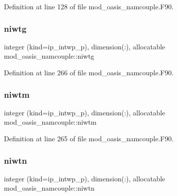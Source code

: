 Definition at line 128 of file mod\+\_\+oasis\+\_\+namcouple.\+F90.

\mbox{\label{namespacemod__oasis__namcouple_a28e887d61cc4b10c00c33a7d0f51a275}} 
\subsubsection{\texorpdfstring{niwtg}{niwtg}}
{\footnotesize\ttfamily integer (kind=ip\+\_\+intwp\+\_\+p), dimension(\+:), allocatable mod\+\_\+oasis\+\_\+namcouple\+::niwtg\hspace{0.3cm}{\ttfamily [private]}}



Definition at line 266 of file mod\+\_\+oasis\+\_\+namcouple.\+F90.

\mbox{\label{namespacemod__oasis__namcouple_a90e4ce86f77bf89c71a9277ff9b5dcbb}} 
\subsubsection{\texorpdfstring{niwtm}{niwtm}}
{\footnotesize\ttfamily integer (kind=ip\+\_\+intwp\+\_\+p), dimension(\+:), allocatable mod\+\_\+oasis\+\_\+namcouple\+::niwtm\hspace{0.3cm}{\ttfamily [private]}}



Definition at line 265 of file mod\+\_\+oasis\+\_\+namcouple.\+F90.

\mbox{\label{namespacemod__oasis__namcouple_a63c2f2977f9cc4839f6bdec7bbbc5fa7}} 
\subsubsection{\texorpdfstring{niwtn}{niwtn}}
{\footnotesize\ttfamily integer (kind=ip\+\_\+intwp\+\_\+p), dimension(\+:), allocatable mod\+\_\+oasis\+\_\+namcouple\+::niwtn\hspace{0.3cm}{\ttfamily [private]}}



